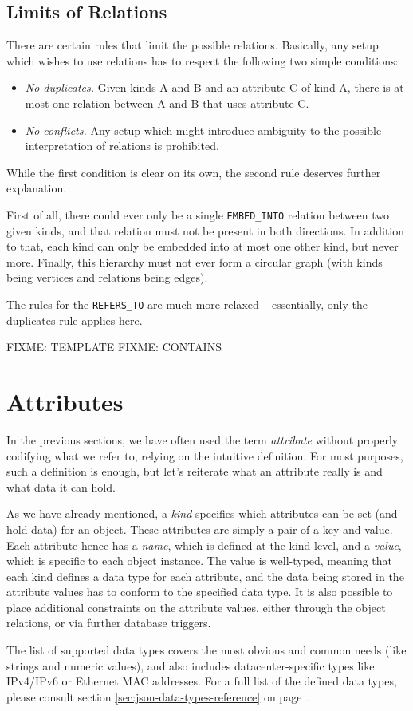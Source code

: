 \documentclass[deska]{subfiles}
\begin{document}
\subsection{Limits of Relations}

There are certain rules that limit the possible relations.  Basically, any setup which wishes to use relations has to
respect the following two simple conditions:

\begin{itemize}
    \item {\em No duplicates.} Given kinds A and B and an attribute C of kind A, there is at most one relation between A
        and B that uses attribute C.
    \item {\em No conflicts.} Any setup which might introduce ambiguity to the possible interpretation of relations is
        prohibited.
\end{itemize}

While the first condition is clear on its own, the second rule deserves further explanation.

First of all, there could ever only be a single {\tt EMBED\_INTO} relation between two given kinds, and that relation
must not be present in both directions.  In addition to that, each kind can only be embedded into at most one other
kind, but never more.  Finally, this hierarchy must not ever form a circular graph (with kinds being vertices and
relations being edges).

The rules for the {\tt REFERS\_TO} are much more relaxed -- essentially, only the {\no duplicates} rule applies here.

FIXME: TEMPLATE
FIXME: CONTAINS

\section{Attributes}

In the previous sections, we have often used the term {\em attribute} without properly codifying what we refer to,
relying on the intuitive definition.  For most purposes, such a definition is enough, but let's reiterate what an
attribute really is and what data it can hold.

As we have already mentioned, a {\em kind} specifies which attributes can be set (and hold data) for an object.  These
attributes are simply a pair of a key and value.  Each attribute hence has a {\em name}, which is defined at the kind
level, and a {\em value}, which is specific to each object instance.  The value is well-typed, meaning that each kind
defines a data type for each attribute, and the data being stored in the attribute values has to conform to the
specified data type.  It is also possible to place additional constraints on the attribute values, either through the
object relations, or via further database triggers.

The list of supported data types covers the most obvious and common needs (like strings and numeric values), and also
includes datacenter-specific types like IPv4/IPv6 or Ethernet MAC addresses.  For a full list of the defined data types,
please consult section \ref{sec:json-data-types-reference} on page~\pageref{sec:json-data-types-reference}.
\end{document}
